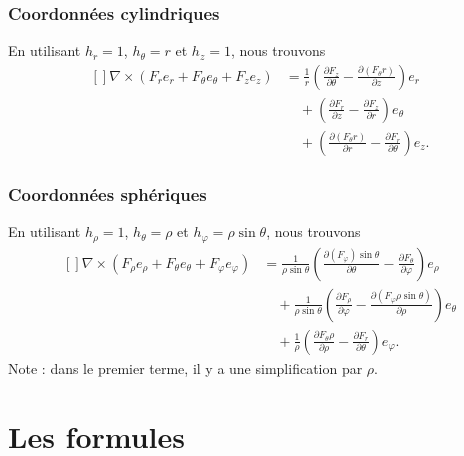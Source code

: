 \subsubsection{Coordonnées cylindriques}

En utilisant $h_r=1$, $h_{\theta}=r$ et $h_z=1$, nous trouvons
\begin{equation}        \label{EqRotationnelCylin}
    \begin{aligned}[]
        \nabla\times(F_re_r+F_{\theta}e_{\theta}+F_ze_z)&=\frac{1}{ r }\left( \frac{ \partial F_z }{ \partial \theta }-\frac{ \partial (F_{\theta}r) }{ \partial z } \right)e_r\\
        &\quad+\left( \frac{ \partial F_r }{ \partial z }-\frac{ \partial F_z }{ \partial r } \right)e_{\theta}\\
        &\quad+\left( \frac{ \partial (F_{\theta} r) }{ \partial r }-\frac{ \partial F_r }{ \partial \theta } \right)e_z.
    \end{aligned}
\end{equation}

\subsubsection{Coordonnées sphériques}

En utilisant $h_{\rho}=1$, $h_{\theta}=\rho$ et $h_{\varphi}=\rho\sin\theta$, nous trouvons
\begin{equation}
    \begin{aligned}[]
        \nabla\times(F_{\rho}e_{\rho}+F_{\theta}e_{\theta}+F_{\varphi}e_{\varphi})&=\frac{1}{ \rho\sin\theta }\left( \frac{ \partial (F_{\varphi})\sin\theta }{ \partial \theta }-\frac{ \partial F_{\theta} }{ \partial \varphi } \right)e_{\rho}\\
        &\quad+\frac{1}{ \rho\sin\theta }\left( \frac{ \partial F_{\rho} }{ \partial \varphi }-\frac{ \partial (F_{\varphi}\rho\sin\theta) }{ \partial \rho } \right)e_{\theta}\\
        &\quad+\frac{1}{ \rho }\left( \frac{ \partial F_{\theta}\rho }{ \partial \rho }-\frac{ \partial F_r }{ \partial \theta } \right)e_{\varphi}.
    \end{aligned}
\end{equation}
Note : dans le premier terme, il y a une simplification par $\rho$.

\section{Les formules}


